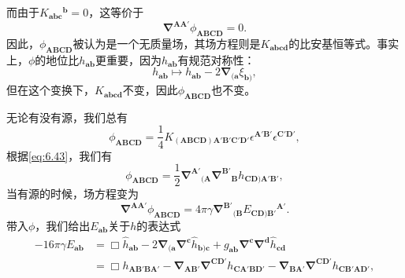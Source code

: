 而由于$K{_{\boldsymbol{abc}}}^{\boldsymbol{b}} =0$，这等价于
\begin{equation*}
	\mathbf{\nabla }^{\boldsymbol{AA} '} \phi _{\boldsymbol{ABCD}} =0.
\end{equation*}
因此，$\phi _{\boldsymbol{ABCD}}$被认为是一个无质量场，其场方程则是$K_{\boldsymbol{abcd}}$的比安基恒等式。事实上，$\phi $的地位比$h_{\boldsymbol{ab}}$更重要，因为$h_{\boldsymbol{ab}}$有规范对称性：
\begin{equation*}
	h_{\boldsymbol{ab}} \mapsto h_{\boldsymbol{ab}} -2\mathbf{\nabla }_{(\boldsymbol{a}} \xi _{\boldsymbol{b})} ,
\end{equation*}
但在这个变换下，$K_{\boldsymbol{abcd}}$不变，因此$\phi _{\boldsymbol{ABCD}}$也不变。



无论有没有源，我们总有
\begin{equation*}
	\phi _{\boldsymbol{ABCD}} =\frac{1}{4} K_{(\boldsymbol{ABCD})\boldsymbol{A} '\boldsymbol{B} '\boldsymbol{C} '\boldsymbol{D} '} \epsilon ^{\boldsymbol{A} '\boldsymbol{B} '} \epsilon ^{\boldsymbol{C} '\boldsymbol{D} '} ,
\end{equation*}
根据\ref{eq:6.43}，我们有
\begin{equation*}
	\phi _{\boldsymbol{ABCD}} =\frac{1}{2}\mathbf{\nabla }^{\boldsymbol{A} '}{}_{(\boldsymbol{A}}\mathbf{\nabla }^{\boldsymbol{B} '}{}_{\boldsymbol{B}} h_{\boldsymbol{CD})\boldsymbol{A} '\boldsymbol{B} '} ,
\end{equation*}
当有源的时候，场方程变为
\begin{equation*}
	\mathbf{\nabla }^{\boldsymbol{AA} '} \phi _{\boldsymbol{ABCD}} =4\pi \gamma \mathbf{\nabla }^{\boldsymbol{B} '}{}_{(\boldsymbol{B}} E{_{\boldsymbol{CD})\boldsymbol{B} '}}^{\boldsymbol{A} '} .
\end{equation*}
带入$\phi $，我们给出$E_{\boldsymbol{ab}}$关于$h$的表达式
\begin{equation*}
	\begin{aligned}
		-16\pi \gamma E_{\boldsymbol{ab}} & =\Box \hat{h}_{\boldsymbol{ab}} -2\mathbf{\nabla }_{(\boldsymbol{a}}\mathbf{\nabla }^{\boldsymbol{c}}\hat{h}_{\boldsymbol{b})\boldsymbol{c}} +g_{\boldsymbol{ab}}\mathbf{\nabla }^{\boldsymbol{c}}\mathbf{\nabla }^{\boldsymbol{d}}\hat{h}_{\boldsymbol{cd}}\\
		& =\Box h_{\boldsymbol{AB} '\boldsymbol{BA} '} -\mathbf{\nabla }_{\boldsymbol{AB} '}\mathbf{\nabla }^{\boldsymbol{CD} '} h_{\boldsymbol{CA} '\boldsymbol{BD} '} -\mathbf{\nabla }_{\boldsymbol{BA} '}\mathbf{\nabla }^{\boldsymbol{CD} '} h_{\boldsymbol{CB} '\boldsymbol{AD} '} ,
	\end{aligned}
\end{equation*}
